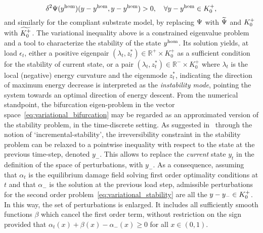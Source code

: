 \begin{equation}
     \label{eq:variational_stability}
     \delta^2 \Psi(y^{\text{hom}})(y - y^{\text{hom}},  y - y^{\text{hom}})  > 0, \quad \forall y-y^{\text{hom}} \in K^+_{0},
 \end{equation}
and similarly for the compliant substrate model, by replacing $\Psi$ with $\widetilde\Psi$ and $K^+_{0}$ with $\widetilde{K^+_{0}}$.
The variational inequality above is a constrained eigenvalue problem and a tool to characterize the stability of the state $y^{\text{hom}}$. Its solution yields, at load $\epsilon_t$, either a positive eigenpair $(\lambda_t, z^*_t)\in \mathbb{R}^+\times K^+_0$ as a sufficient condition for the stability of current state, or a pair $(\lambda_t, z^*_t)\in \mathbb{R}^-\times K^+_0$ where $\lambda_t$ is the local (negative) energy curvature and the eigenmode $z^*_t$, indicating the direction of maximum energy decrease is interpreted as the \emph{instability mode}, pointing the system towards an optimal direction of energy descent. 
From the numerical standpoint, the bifurcation eigen-problem in the vector space~\eqref{eq:variational_bifurcation} may be regarded as an approximated version of the stability problem, in the time-discrete setting. As suggested in~\cite{Baldelli2021-gc} through the notion of `incremental-stability', the irreversibility constraint in the stability problem can be relaxed to a pointwise inequality with respect to the state at the previous time-step, denoted $y_-$.
This allows to replace the \emph{current} state $y_t$ in the definition of the space of perturbations, with $y_-$. As a consequence, assuming that $\alpha_t$ is the equilibrium damage field solving first order optimality conditions at $t$ and that $\alpha_-$ is the solution at the previous load step, admissible perturbations for the second order problem~\eqref{eq:variational_stability} are all the $y-y_-\in K^+_{0}$. In this way, the set of perturbations is enlarged. It includes all sufficiently smooth functions $\beta$ which cancel the first order term, without restriction on the sign provided that $\alpha_t(x) + \beta(x) - \alpha_-(x)\geq 0$ for all $x\in (0, 1)$.
% 

